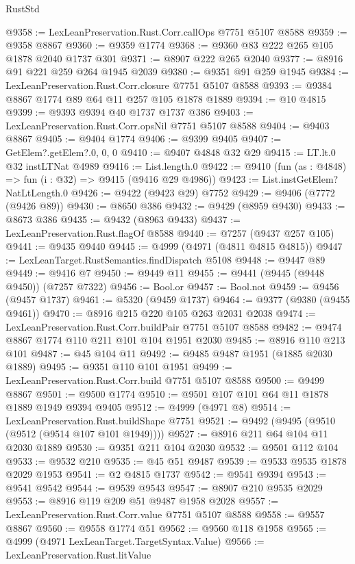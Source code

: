 \begin{lexlean}{RustStd}
\begin{coremodule}
@9358 := LexLeanPreservation.Rust.Corr.callOps @7751 @5107 @8588
@9359 := @9358 @8867
@9360 := @9359 @1774
@9368 := @9360 @83 @222 @265 @105 @1878 @2040 @1737 @301
@9371 := @8907 @222 @265 @2040
@9377 := @8916 @91 @221 @259 @264 @1945 @2039
@9380 := @9351 @91 @259 @1945
@9384 := LexLeanPreservation.Rust.Corr.closure @7751 @5107 @8588
@9393 := @9384 @8867 @1774 @89 @64 @11 @257 @105 @1878 @1889
@9394 := @10 @4815
@9399 := @9393 @9394 @40 @1737 @1737 @386
@9403 := LexLeanPreservation.Rust.Corr.opsNil @7751 @5107 @8588
@9404 := @9403 @8867
@9405 := @9404 @1774
@9406 := @9399 @9405
@9407 := GetElem?.getElem?.{0, 0, 0}
@9410 := @9407 @4848 @32 @29
@9415 := LT.lt.{0} @32 instLTNat @4989
@9416 := List.length.{0}
@9422 := @9410 (fun (as : @4848) => fun (i : @32) => @9415 (@9416 @29 @4986))
@9423 := List.instGetElem?NatLtLength.{0}
@9426 := @9422 (@9423 @29) @7752
@9429 := @9406 (@7772 (@9426 @89))
@9430 := @8650 @386
@9432 := @9429 (@8959 @9430)
@9433 := @8673 @386
@9435 := @9432 (@8963 @9433)
@9437 := LexLeanPreservation.Rust.flagOf @8588
@9440 := @7257 (@9437 @257 @105)
@9441 := @9435 @9440
@9445 := @4999 (@4971 (@4811 @4815 @4815))
@9447 := LexLeanTarget.RustSemantics.findDispatch @5108
@9448 := @9447 @89
@9449 := @9416 @7
@9450 := @9449 @11
@9455 := @9441 (@9445 (@9448 @9450)) (@7257 @7322)
@9456 := Bool.or
@9457 := Bool.not
@9459 := @9456 (@9457 @1737)
@9461 := @5320 (@9459 @1737)
@9464 := @9377 (@9380 (@9455 @9461))
@9470 := @8916 @215 @220 @105 @263 @2031 @2038
@9474 := LexLeanPreservation.Rust.Corr.buildPair @7751 @5107 @8588
@9482 := @9474 @8867 @1774 @110 @211 @101 @104 @1951 @2030
@9485 := @8916 @110 @213 @101
@9487 := @45 @104 @11
@9492 := @9485 @9487 @1951 (@1885 @2030 @1889)
@9495 := @9351 @110 @101 @1951
@9499 := LexLeanPreservation.Rust.Corr.build @7751 @5107 @8588
@9500 := @9499 @8867
@9501 := @9500 @1774
@9510 := @9501 @107 @101 @64 @11 @1878 @1889 @1949 @9394 @9405
@9512 := @4999 (@4971 @8)
@9514 := LexLeanPreservation.Rust.buildShape @7751
@9521 := @9492 (@9495 (@9510 (@9512 (@9514 @107 @101 @1949))))
@9527 := @8916 @211 @64 @104 @11 @2030 @1889
@9530 := @9351 @211 @104 @2030
@9532 := @9501 @112 @104
@9533 := @9532 @210
@9535 := @45 @51 @9487
@9539 := @9533 @9535 @1878 @2029 @1953
@9541 := @2 @4815 @1737
@9542 := @9541 @9394
@9543 := @9541 @9542
@9544 := @9539 @9543
@9547 := @8907 @210 @9535 @2029
@9553 := @8916 @119 @209 @51 @9487 @1958 @2028
@9557 := LexLeanPreservation.Rust.Corr.value @7751 @5107 @8588
@9558 := @9557 @8867
@9560 := @9558 @1774 @51
@9562 := @9560 @118 @1958
@9565 := @4999 (@4971 LexLeanTarget.TargetSyntax.Value)
@9566 := LexLeanPreservation.Rust.litValue

\end{coremodule}
\end{lexlean}
